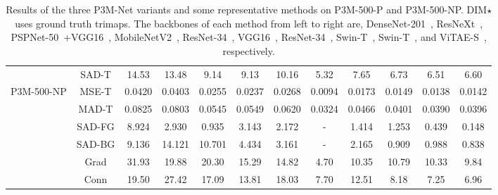 \documentclass[twocolumn]{svjour3}
\begin{document}
\begin{table*}[htb]
\begin{center}
{\begin{tabular}{c|c|ccccc|c|cccc}
&SAD-T & 14.53& 13.48& 9.14& 9.13&10.16 & 5.32& 7.65& 6.73 & 6.51 & 6.60 \\
P3M-500-NP&MSE-T & 0.0420& 0.0403& 0.0255&0.0237& 0.0268 & 0.0094& 0.0173& 0.0149 & 0.0138 & 0.0142 \\
&MAD-T &0.0825 &0.0803 &0.0545 &0.0549&0.0620&0.0324 &0.0466 & 0.0401 & 0.0390 & 0.0396 \\
&SAD-FG &8.924 &2.930 &0.935 & 3.143&2.172 & - & 1.414& 1.253 & 0.439 & 0.148 \\
&SAD-BG & 9.136&14.121 &10.701 &4.434&3.161  & - &2.165 & 0.909 & 0.988 & 0.838 \\
&Grad & 31.93& 19.88& 20.30&15.29 &14.82 &4.70 &10.35 & 10.79 & 10.33 & 9.84 \\
&Conn & 19.50& 27.42& 17.09&13.81& 18.03& 7.70& 12.51& 8.18 & 7.25 & 6.96 \\
\hline
\end{tabular}}
\end{center}
\caption{Results of the three P3M-Net variants and some representative methods on P3M-500-P and P3M-500-NP. DIM$\star$ uses ground truth trimaps. The backbones of each method from left to right are, DenseNet-201~\citep{huang2017densely}, ResNeXt~\citep{resnext}, PSPNet-50~\citep{zhao2017pyramid}+VGG16~\citep{vgg16}, MobileNetV2~\citep{mobilenetv2}, ResNet-34~\citep{he2016deep}, VGG16~\citep{vgg16}, ResNet-34~\citep{he2016deep}, Swin-T~\citep{swin}, Swin-T~\citep{swin}, and ViTAE-S~\citep{vitae}, respectively.}
\label{tab:experiment}
\end{table*}
\end{document}
